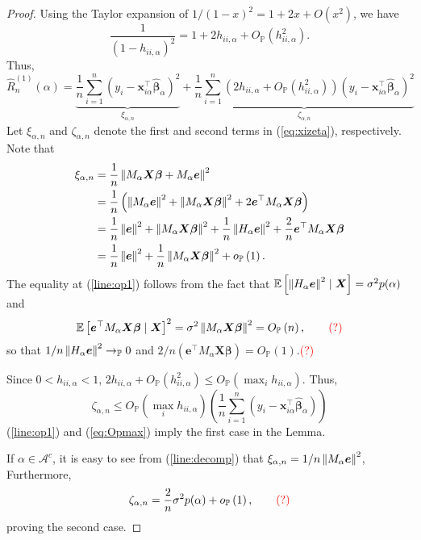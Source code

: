 \documentclass[12pt, letter paper]{article}
\newcommand{\1}{\mathmybb{1}}
\newcommand{\0}{\emptyset}
\newcommand{\prob}{\mathbb{P}}
\newcommand{\Ep}[1]{\mathbb{E}\left[ #1 \right]}
\newcommand{\paren}[1]{\left(#1 \right)}
\newcommand{\norm}[1]{\left|\hspace{-1pt}\left|#1 \right|\hspace{-1pt}\right|}
\newcommand{\normsq}[1]{\norm{#1}^{2}}
\newcommand{\Acal}{\mathcal{A}}
\newcommand{\X}{\boldsymbol{X}}
\newcommand{\x}{\boldsymbol{x}}
\newcommand{\e}{\boldsymbol{e}}
\newcommand{\bbeta}{\boldsymbol{\beta}}
\newcommand{\bbetahat}{\boldsymbol{\hat{\beta}}}
\newcommand{\Rhat}[2]{\hat{R}_{n}^{#1}\paren{#2}}
\newcommand{\lev}{h_{ii,\alpha}}
\newcommand{\loocv}{\Rhat{(1)}{\alpha}}
\newcommand{\op}[1]{o_{\prob}\paren{#1}}
\newcommand{\Op}[1]{O_{\prob}\paren{#1}}
\begin{document}
\begin{proof}
    Using the Taylor expansion of \(1/{(1-x)}^{2} = 1+2x + O(x^{2})\), we have
    \[\frac{1}{\paren{1-\lev}^{2}} = 1 + 2\lev + \Op{\lev^{2}}.\]
    Thus,
    \begin{equation}
        \label{eq:xizeta}
        \loocv = \underbrace{\frac{1}{n}\sum_{i=1}^{n}\paren{y_{i}-\x_{i\alpha}^{\top}\bbetahat_{\alpha}}^{2}}_{\xi_{\alpha,n}} + \underbrace{\frac{1}{n}\sum_{i=1}^{n}\paren{2\lev + \Op{\lev^{2}}}\paren{y_{i}-\x_{i\alpha}^{\top}\bbetahat_{\alpha}}^{2}}_{\zeta_{\alpha,n}}
    \end{equation}
    Let \(\xi_{\alpha,n}\) and \(\zeta_{\alpha,n}\) denote the first and second terms in (\ref{eq:xizeta}), respectively. Note that
    \begin{align}
        \notag\xi_{\alpha,n} &= \frac{1}{n}\normsq{M_{\alpha}\X\bbeta + M_{\alpha}\e}\\
        \label{line:decomp}&= \frac{1}{n}\paren{\normsq{M_{\alpha}\e} + \normsq{M_{\alpha}\X\bbeta} + 2 \e^{\top}M_{\alpha}\X\bbeta}\\
        \notag&=\frac{1}{n}\normsq{\e} + \normsq{M_{\alpha}\X\bbeta} + \frac{1}{n}\normsq{H_{\alpha}\e} + \frac{2}{n}\e^{\top}M_{\alpha}\X\bbeta\\
        \label{line:op1}&= \frac{1}{n}\normsq{\e} + \frac{1}{n}\normsq{M_{\alpha}\X\bbeta} + \op{1}.
    \end{align}
    The equality at (\ref{line:op1}) follows from the fact that \(\Ep{\normsq{H_{\alpha}\e}\mid\X} = \sigma^{2}p(\alpha)\) and 
    \[\Ep{\e^{\top}M_{\alpha}\X\bbeta\mid\X}^{2} = \sigma^{2}\normsq{M_{\alpha}\X\bbeta} = \Op{n},\qquad\textcolor{red}{(?)}\]
    so that \(1/n\normsq{H_{\alpha}\e}\to_{\prob}0\) and \(2/n\paren{\e^{\top}M_{\alpha}\X\bbeta}=\Op{1}\).\quad\textcolor{red}{(?)} %

    Since \(0<\lev<1\), \(2\lev + \Op{\lev^{2}}\leq\Op{\max_{i}\lev}\). Thus,
    \begin{equation}
        \label{eq:Opmax}
        \zeta_{\alpha,n}\leq\Op{\max_{i}\lev}\paren{\frac{1}{n}\sum_{i=1}^{n}\paren{y_{i} - \x_{i\alpha}^{\top}\bbetahat_{\alpha}}}
    \end{equation}
    (\ref{line:op1}) and (\ref{eq:Opmax}) imply the first case in the Lemma.

    If \(\alpha\in\Acal^{c}\), it is easy to see from (\ref{line:decomp}) that \(\xi_{\alpha,n} = 1/n\normsq{M_{\alpha}\e}\), Furthermore,
    \[\zeta_{\alpha,n} = \frac{2}{n}\sigma^{2}p(\alpha) + \op{1},\qquad\textcolor{red}{(?)}\]
    proving the second case.
\end{proof}
\end{document}
